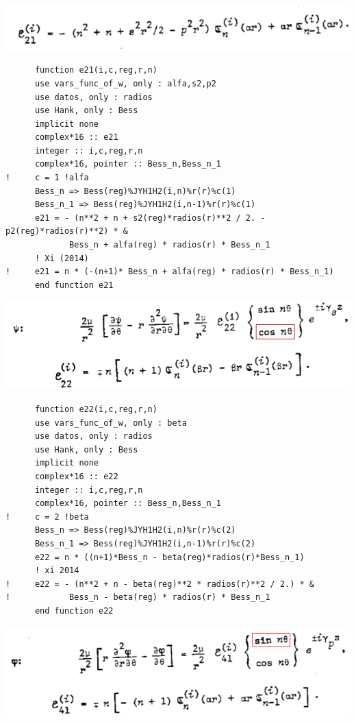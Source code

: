 \documentclass [11pt,spanish]{article}
\begin{document}
\includegraphics[scale=0.5]{e21b}
\begingroup
\fontsize{10pt}{12pt}
\selectfont
{}
\begin{shaded}
\begin{verbatim}
      function e21(i,c,reg,r,n)
      use vars_func_of_w, only : alfa,s2,p2
      use datos, only : radios
      use Hank, only : Bess
      implicit none
      complex*16 :: e21
      integer :: i,c,reg,r,n
      complex*16, pointer :: Bess_n,Bess_n_1
!     c = 1 !alfa
      Bess_n => Bess(reg)%JYH1H2(i,n)%r(r)%c(1)
      Bess_n_1 => Bess(reg)%JYH1H2(i,n-1)%r(r)%c(1)
      e21 = - (n**2 + n + s2(reg)*radios(r)**2 / 2. - p2(reg)*radios(r)**2) * &
             Bess_n + alfa(reg) * radios(r) * Bess_n_1
      ! Xi (2014)
!     e21 = n * (-(n+1)* Bess_n + alfa(reg) * radios(r) * Bess_n_1)
      end function e21
\end{verbatim}
\end{shaded}
\endgroup
\includegraphics[scale=0.5]{e22}
\begingroup
\fontsize{10pt}{12pt}
\selectfont
{}
\begin{shaded}
\begin{verbatim}
      function e22(i,c,reg,r,n)
      use vars_func_of_w, only : beta
      use datos, only : radios
      use Hank, only : Bess
      implicit none
      complex*16 :: e22
      integer :: i,c,reg,r,n
      complex*16, pointer :: Bess_n,Bess_n_1
!     c = 2 !beta
      Bess_n => Bess(reg)%JYH1H2(i,n)%r(r)%c(2)
      Bess_n_1 => Bess(reg)%JYH1H2(i,n-1)%r(r)%c(2)
      e22 = n * ((n+1)*Bess_n - beta(reg)*radios(r)*Bess_n_1)
      ! xi 2014
!     e22 = - (n**2 + n - beta(reg)**2 * radios(r)**2 / 2.) * &
!            Bess_n - beta(reg) * radios(r) * Bess_n_1
      end function e22
\end{verbatim}
\end{shaded}
\endgroup
\includegraphics[scale=0.5]{e41}
\end{document}
